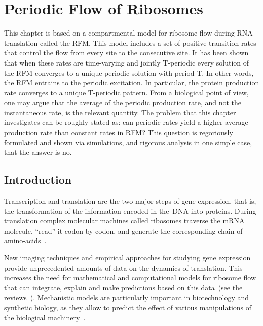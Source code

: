 \chapter{Periodic Flow of Ribosomes}
\label{chap:rfm}


This chapter is based on a compartmental model for ribosome flow during RNA translation called the \acf{RFM}. 
This model includes a set of positive transition rates that control the flow from every site to the consecutive site. 
It has been shown that when these rates are time-varying and jointly T-periodic every solution of the \ac{RFM} converges to a unique periodic solution with period T. 
In other words, the \ac{RFM} entrains to the periodic excitation.  
In particular, the protein production rate converges to a unique T-periodic pattern.
From a biological point of view, one may argue that the average of the periodic production rate, and not the instantaneous rate, is the relevant quantity. 
The problem that this chapter investigates can be roughly stated as: can periodic rates yield a higher average production rate than constant rates in \ac{RFM}? 
This question is regoriously formulated and shown via simulations, and rigorous analysis in one simple case, that the answer is no.

\section{Introduction}
\label{rfm:intro}

Transcription and translation   are the two major steps of gene expression, that is, the transformation of  the information encoded in the~DNA into proteins. 
During  translation complex molecular machines called ribosomes traverse the mRNA molecule, ``read'' it codon by codon, and generate the corresponding chain of amino-acids~\cite{Alberts2002}. 

New imaging techniques \cite{ruijtenberg2018imaging, levesque2013single, moffitt2018molecular, briggs2018dynamics} and empirical approaches \cite{huang2018saver, edsgard2018identification, ingolia2009genome, ghaemmaghami2003global, zhang2018rose, chen2018evolution} for studying gene expression provide unprecedented amounts of data on the dynamics of translation. 
This increases the need for mathematical and computational models for ribosome flow that can integrate, explain and make predictions based on this data~(see the reviews~\cite{TASEP_tutorial_2011,haar_survey_2012,Zhao2014}). 
Mechanistic models are particularly important in biotechnology and synthetic biology, as they allow to predict the effect of various manipulations of the biological machinery~\cite{singh2018computational, marchisio2018computational}.

